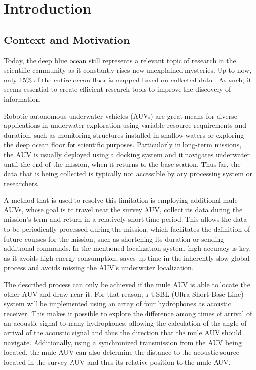 \chapter{Introduction} \label{chap:intro}

\section{Context and Motivation} \label{sec:context}

Today, the deep blue ocean still represents a relevant topic of research in the scientific community as it constantly rises new unexplained mysteries. Up to now, only 15\% of the entire ocean floor is mapped based on collected data \cite{deeperblue}. As such, it seems essential to create efficient research tools to improve the discovery of information.


Robotic autonomous underwater vehicles (AUVs) are great means for diverse applications in underwater exploration using variable resource requirements and duration, such as monitoring structures installed in shallow waters or exploring the deep ocean floor for scientific purposes. Particularly in long-term missions, the AUV is usually deployed using a docking system and it navigates underwater until the end of the mission, when it returns to the base station. Thus far, the data that is being collected is typically not accessible by any processing system or researchers. 

A method that is used to resolve this limitation is employing additional mule AUVs, whose goal is to travel near the survey AUV, collect its data during the mission's term and return in a relatively short time period. This allows the data to be periodically processed during the mission, which facilitates the definition of future courses for the mission, such as shortening its duration or sending additional commands. In the mentioned localization system, high accuracy is key, as it avoids high energy consumption, saves up time in the inherently slow global process and avoids missing the AUV's underwater localization.

The described process can only be achieved if the mule AUV is able to locate the other AUV and draw near it. For that reason, a USBL (Ultra Short Base-Line) system will be implemented using an array of four hydrophones as acoustic receiver. This makes it possible to explore the difference among times of arrival of an acoustic signal to many hydrophones, allowing the calculation of the angle of arrival of the acoustic signal and thus the direction that the mule AUV should navigate. Additionally, using a synchronized transmission from the AUV being located, the mule AUV can also determine the distance to the acoustic source located in the survey AUV and thus its relative position to the mule AUV.


